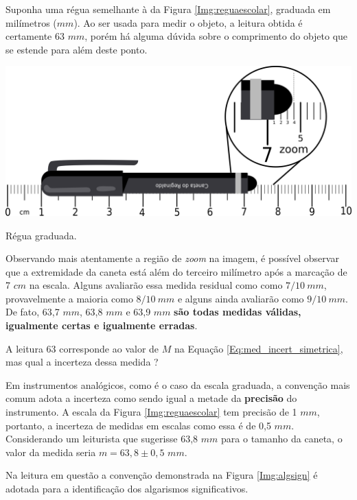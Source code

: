 \documentclass[a4paper, 11pt]{report}
\begin{document}
Suponha uma régua semelhante à da Figura \ref{Img:reguaescolar}, 
graduada em milímetros ($mm$). Ao ser usada para medir o 
objeto, a leitura obtida é certamente 63 $mm$, porém há alguma 
dúvida sobre o comprimento do objeto que se estende para além deste ponto. 

\begin{staticfigure}
    \centering
    \includegraphics[scale=.45]{img/reguaescolar.png}
    \caption{\footnotesize Régua graduada.}
    \label{Img:reguaescolar}
\end{staticfigure}

Observando mais atentamente a região de \emph{zoom} na imagem, é possível 
observar que a extremidade da caneta está além do terceiro milímetro após a 
marcação de 7 $cm$ na escala. Alguns avaliarão essa medida residual como 
como $7/10 \: mm$, provavelmente a maioria como $8/10 \: mm$ e
alguns ainda avaliarão como $9/10 \: mm$. De fato, 63,7 $mm$, 63,8 $mm$ e 
63,9 $mm$ \textbf{são todas medidas válidas, igualmente certas e igualmente 
erradas}.

A leitura 63 corresponde ao valor de $M$ na Equação 
\ref{Eq:med_incert_simetrica}, mas qual a incerteza dessa medida ? 

Em instrumentos analógicos, como é o caso da escala graduada, a convenção mais 
comum adota a incerteza como sendo igual a metade da \textbf{precisão} do 
instrumento. A escala da Figura \ref{Img:reguaescolar} tem precisão de 1 $mm$, 
portanto, a incerteza de medidas em escalas como essa é de 0,5 $mm$. 
Considerando um leiturista que sugerisse 63,8 $mm$ para o tamanho da caneta, 
o valor da medida seria $m = 63,8 \pm 0,5$ $mm$.

Na leitura em questão a convenção demonstrada na Figura \ref{Img:algsign} é 
adotada para a identificação dos algarismos significativos. 
\end{document}
